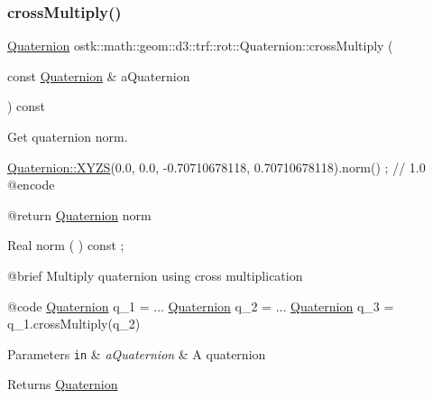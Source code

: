 \subsubsection{\texorpdfstring{cross\+Multiply()}{crossMultiply()}}
{\footnotesize\ttfamily \hyperlink{classostk_1_1math_1_1geom_1_1d3_1_1trf_1_1rot_1_1_quaternion}{Quaternion} ostk\+::math\+::geom\+::d3\+::trf\+::rot\+::\+Quaternion\+::cross\+Multiply (\begin{DoxyParamCaption}\item[{const \hyperlink{classostk_1_1math_1_1geom_1_1d3_1_1trf_1_1rot_1_1_quaternion}{Quaternion} \&}]{a\+Quaternion }\end{DoxyParamCaption}) const}



Get quaternion norm. 


\begin{DoxyCode}
                        \hyperlink{classostk_1_1math_1_1geom_1_1d3_1_1trf_1_1rot_1_1_quaternion_ac57ea57a4033622ed1389101b2e58c76}{Quaternion::XYZS}(0.0, 0.0, -0.70710678118, 0.70710678118).norm() ; \textcolor{comment}{
      // 1.0}
    @encode
   
    @\textcolor{keywordflow}{return}             \hyperlink{classostk_1_1math_1_1geom_1_1d3_1_1trf_1_1rot_1_1_quaternion_ad9fd7d8eb5effb4d4e0394bbb5bb86dc}{Quaternion} norm

Real                    norm                                        ( ) \textcolor{keyword}{const} ;

    @brief              Multiply quaternion \textcolor{keyword}{using} cross multiplication
   
    @code
                        \hyperlink{classostk_1_1math_1_1geom_1_1d3_1_1trf_1_1rot_1_1_quaternion_ad9fd7d8eb5effb4d4e0394bbb5bb86dc}{Quaternion} q\_1 = ...
                        \hyperlink{classostk_1_1math_1_1geom_1_1d3_1_1trf_1_1rot_1_1_quaternion_ad9fd7d8eb5effb4d4e0394bbb5bb86dc}{Quaternion} q\_2 = ...
                        \hyperlink{classostk_1_1math_1_1geom_1_1d3_1_1trf_1_1rot_1_1_quaternion_ad9fd7d8eb5effb4d4e0394bbb5bb86dc}{Quaternion} q\_3 = q\_1.crossMultiply(q\_2)
\end{DoxyCode}



\begin{DoxyParams}[1]{Parameters}
\mbox{\tt in}  & {\em a\+Quaternion} & A quaternion \\
\hline
\end{DoxyParams}
\begin{DoxyReturn}{Returns}
\hyperlink{classostk_1_1math_1_1geom_1_1d3_1_1trf_1_1rot_1_1_quaternion}{Quaternion} 
\end{DoxyReturn}
\mbox{\label{classostk_1_1math_1_1geom_1_1d3_1_1trf_1_1rot_1_1_quaternion_a3daba388529ae95f39e89cb3a4ec9714}} 
